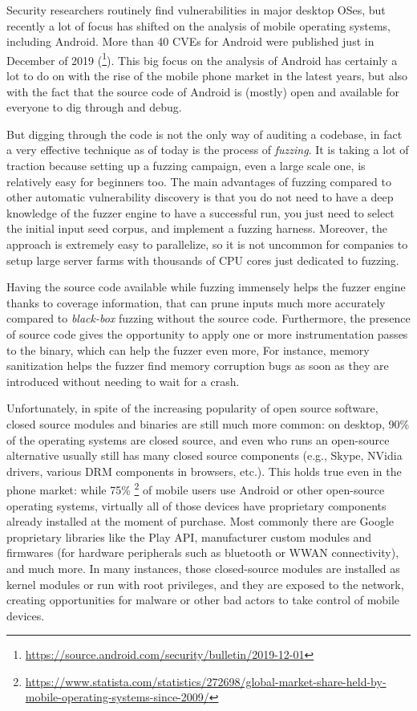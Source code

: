 \documentclass[a4paper,11pt,oneside]{report}
\begin{document}
Security researchers routinely find vulnerabilities in major desktop OSes, but 
recently a lot of focus has shifted on the analysis of mobile operating 
systems, including Android.  More than 40 CVEs for Android were published just 
in December of 2019 
(\footnote{\url{https://source.android.com/security/bulletin/2019-12-01}}).  
This big focus on the analysis of Android has certainly a lot to do on with the 
rise of the mobile phone market in the latest years, but also with the fact 
that the source code of Android is (mostly) open and available for everyone to 
dig through and debug.

But digging through the code is not the only way of auditing a codebase, in 
fact a very effective technique as of today is the process of \emph{fuzzing}.  
It is taking a lot of traction because setting up a fuzzing campaign, even a 
large scale one, is relatively easy for beginners too. The main advantages of 
fuzzing compared to other automatic vulnerability discovery is that you do not
need to have a deep knowledge of the fuzzer engine to have a successful run, 
you just need to select the initial input seed corpus, and implement a fuzzing 
harness. Moreover, the approach is extremely easy to parallelize, so it is not 
uncommon for companies to setup large server farms with thousands of CPU cores 
just dedicated to fuzzing.

Having the source code available while fuzzing immensely helps the fuzzer 
engine thanks to coverage information, that can prune inputs much more 
accurately compared to \emph{black-box} fuzzing without the source code.  
Furthermore, the presence of source code gives the opportunity to apply one or 
more instrumentation passes to the binary, which can help the fuzzer even more, 
For instance, memory sanitization helps the fuzzer find memory corruption bugs 
as soon as they are introduced without needing to wait for a crash. 

Unfortunately, in spite of the increasing popularity of open source software, 
closed source modules and binaries are still much more common: on desktop, 90\% 
of the operating systems are closed source, and even who runs an open-source 
alternative usually still has many closed source components (e.g., Skype, 
NVidia drivers, various DRM components in browsers, etc.). This holds true even 
in the phone market: while 75\% \footnote{\url{
https://www.statista.com/statistics/272698/global-market-share-held-by-mobile-operating-systems-since-2009/}}
of mobile users use Android or other open-source operating systems, virtually 
all of those devices have proprietary components already installed at the 
moment of purchase. Most commonly there are Google proprietary libraries like 
the Play API, manufacturer custom modules and firmwares (for hardware 
peripherals such as bluetooth or WWAN connectivity), and much more. In many 
instances, those closed-source modules are installed as kernel modules or run 
with root privileges, and they are exposed to the network, creating 
opportunities for malware or other bad actors to take control of mobile 
devices.
\end{document}
